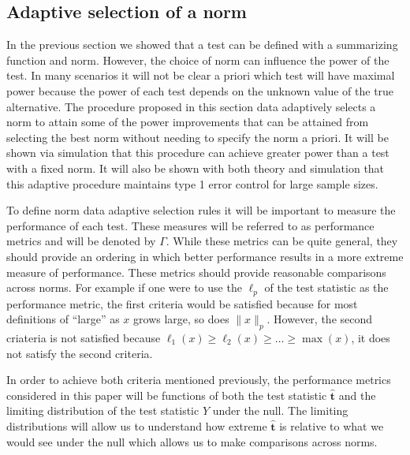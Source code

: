 \documentclass{article}
\newcommand{\tst}{\hat{\boldsymbol{t}}}
\newcommand{\rvt}{Y}
\begin{document}
\subsection{Adaptive selection of a norm}
In the previous section we showed that a test can be defined with a summarizing function and norm. However, the choice of norm can influence the power of the test. In many scenarios it will not be clear a priori which test will have maximal power because the power of each test depends on the unknown value of the true alternative. The procedure proposed in this section data adaptively selects a norm to attain some of the power improvements that can be attained from selecting the best norm without needing to specify the norm a priori. It will be shown via simulation that this procedure can achieve greater power than a test with a fixed norm.  It will also be shown with  both theory and simulation that this adaptive procedure maintains type 1 error control for large sample sizes.  


To define norm data adaptive selection rules it will be important to measure the performance of each test. These measures will be referred to as performance metrics and will be denoted by $\Gamma$. While these metrics can be quite general, they should provide an ordering in which better performance results in a more extreme measure of performance. These metrics should provide reasonable comparisons across norms.  For example if one were to use the $\ell_p$ of the test statistic as the performance metric, the first criteria would be satisfied because for most definitions of ``large'' as $x$ grows large, so does $\|x\|_p$.  However, the second criateria is not satisfied because $\ell_1(x) \geq \ell_2(x) \geq \dots \geq \max(x)$, it does not satisfy the second criteria. 

In order to achieve both criteria mentioned previously, the performance metrics considered in this paper will be functions of both the test statistic $\tst$ and the limiting distribution of the test statistic $\rvt$ under the null. The limiting distributions will allow us to understand how extreme $\tst$ is relative to what we would see under the null which allows us to make comparisons across norms.
\end{document}
